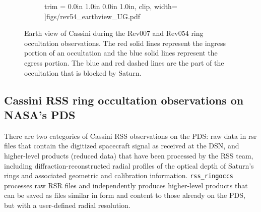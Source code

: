\documentclass[titlepage, 12pt]{article}
\begin{document}
\begin{figure}[H]
\begin{subfigure}[b]{0.48\textwidth}
                        trim = {0.0in 1.0in 0.0in 1.0in},
                        clip,
                        width=\textwidth
                    ]{figs/rev54_earthview_UG.pdf}
                    \label{fig:rev54}
                \end{subfigure}
                \caption[Earth View of Cassini During Rev007 and Rev054]{%
                    Earth view of Cassini during the Rev007
                    and Rev054 ring occultation observations.
                    The red solid lines represent the ingress portion of
                    an occultation and the blue solid lines represent the
                    egress portion. The blue and red dashed lines are the
                    part of the occultation that is blocked by Saturn.
                }
            \end{figure}
        \subsection{Cassini RSS ring occultation
                    observations on NASA's PDS}
            There are two categories of Cassini RSS observations
            on the PDS: raw data  in \gls{rsr} files
            that contain the digitized spacecraft signal
            as received at the DSN, and higher-level products
            (reduced data) that have been processed by
            the RSS team, including diffraction-reconstructed
            radial profiles of the optical depth of
            Saturn's rings and associated geometric and
            calibration information.
            \texttt{rss\_ringoccs} processes raw
            RSR files and independently produces
            higher-level products that can be saved as
            files similar in form and content to those
            already on the PDS, but with a user-defined
            radial resolution.
\end{document}
